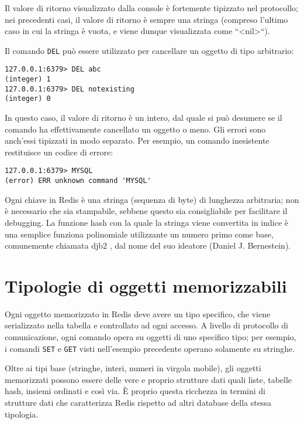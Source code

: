 Il valore di ritorno visualizzato dalla console è fortemente tipizzato nel protocollo;
nei precedenti casi, il valore di ritorno è sempre una stringa (compreso l'ultimo
caso in cui la stringa è vuota, e viene dunque visualizzata come ``<nil>``).

Il comando \verb|DEL| può essere utilizzato per cancellare un oggetto di tipo
arbitrario:

\medskip
\begin{lstlisting}
127.0.0.1:6379> DEL abc
(integer) 1
127.0.0.1:6379> DEL notexisting
(integer) 0
\end{lstlisting}

In questo caso, il valore di ritorno è un intero, dal quale si può desumere se il comando
ha effettivamente cancellato un oggetto o meno. Gli errori sono anch'essi tipizzati in
modo separato. Per esempio, un comando inesistente restituisce un codice di errore:

\medskip
\begin{lstlisting}
127.0.0.1:6379> MYSQL
(error) ERR unknown command 'MYSQL'
\end{lstlisting}

Ogni chiave in Redis è una stringa (sequenza di byte) di lunghezza arbitraria; non è
necessario che sia stampabile, sebbene questo sia consigliabile per facilitare il
debugging. La funzione hash con la quale la stringa viene convertita in indice è
una semplice funziona polinomiale utilizzante un numero primo come base, 
comunemente chiamata djb2 \cite{djbhash}, dal nome del suo ideatore (Daniel J. Bernestein).

\section{Tipologie di oggetti memorizzabili}

Ogni oggetto memorizzato in Redis deve avere un tipo specifico, che viene serializzato
nella tabella e controllato ad ogni accesso. A livello di protocollo di comunicazione,
ogni comando opera su oggetti di uno specifico tipo; per esempio, i comandi \verb|SET|
e \verb|GET| visti nell'esempio precedente operano solamente su stringhe.

Oltre ai tipi base (stringhe, interi, numeri in virgola mobile), gli oggetti memorizzati
possono essere delle vere e proprio strutture dati quali liste, tabelle hash, insiemi
ordinati e così via. È proprio questa ricchezza in termini di strutture dati che caratterizza
Redis rispetto ad altri database della stessa tipologia.

